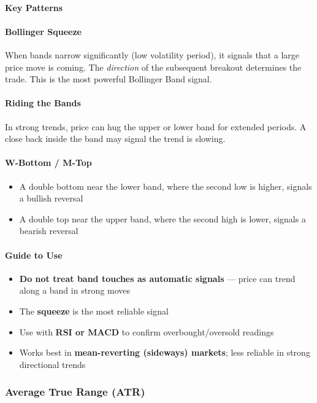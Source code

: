 \documentclass[12pt,openany]{book}
\begin{document}
\paragraph{Key Patterns}

\paragraph{Bollinger Squeeze}
When bands narrow significantly (low volatility period), it signals that a large price move is coming. The \emph{direction} of the subsequent breakout determines the trade. This is the most powerful Bollinger Band signal.

\paragraph{Riding the Bands}
In strong trends, price can hug the upper or lower band for extended periods. A close back inside the band may signal the trend is slowing.

\paragraph{W-Bottom / M-Top}
\begin{itemize}[leftmargin=*]
    \item A double bottom near the lower band, where the second low is higher, signals a bullish reversal
    \item A double top near the upper band, where the second high is lower, signals a bearish reversal
\end{itemize}

\paragraph{Guide to Use}
\begin{itemize}[leftmargin=*]
    \item \textbf{Do not treat band touches as automatic signals} --- price can trend along a band in strong moves
    \item The \textbf{squeeze} is the most reliable signal
    \item Use with \textbf{RSI or MACD} to confirm overbought/oversold readings
    \item Works best in \textbf{mean-reverting (sideways) markets}; less reliable in strong directional trends
\end{itemize}

\subsubsection{Average True Range (ATR)}
\end{document}
